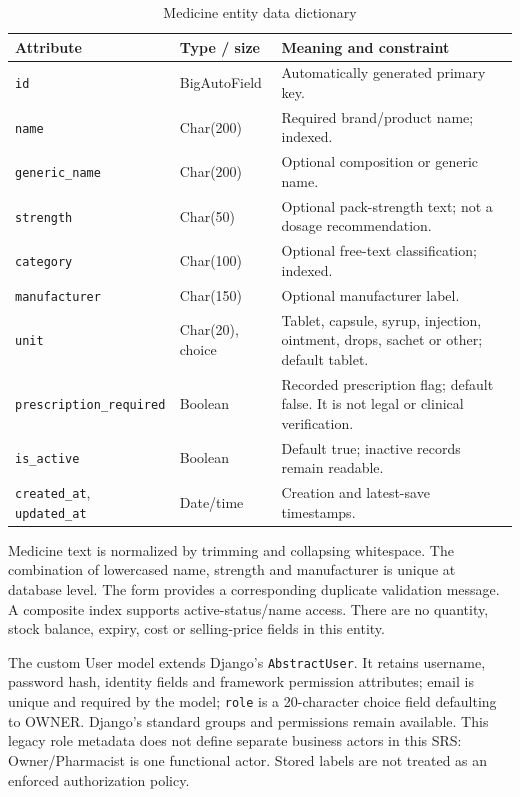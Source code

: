 \documentclass{article}
\begin{document}
\begin{table}[H]
\centering\small
\caption{Medicine entity data dictionary}
\begin{tabularx}{\textwidth}{L{46mm}L{28mm}Y}
\toprule Attribute & Type / size & Meaning and constraint\\\midrule
\texttt{id} & BigAutoField & Automatically generated primary key.\\
\texttt{name} & Char(200) & Required brand/product name; indexed.\\
\texttt{generic\_name} & Char(200) & Optional composition or generic name.\\
\texttt{strength} & Char(50) & Optional pack-strength text; not a dosage recommendation.\\
\texttt{category} & Char(100) & Optional free-text classification; indexed.\\
\texttt{manufacturer} & Char(150) & Optional manufacturer label.\\
\texttt{unit} & Char(20), choice & Tablet, capsule, syrup, injection, ointment, drops, sachet or other; default tablet.\\
\texttt{prescription\_required} & Boolean & Recorded prescription flag; default false. It is not legal or clinical verification.\\
\texttt{is\_active} & Boolean & Default true; inactive records remain readable.\\
\texttt{created\_at}, \texttt{updated\_at} & Date/time & Creation and latest-save timestamps.\\
\bottomrule
\end{tabularx}
\end{table}
Medicine text is normalized by trimming and collapsing whitespace. The combination of lowercased name, strength and manufacturer is unique at database level. The form provides a corresponding duplicate validation message. A composite index supports active-status/name access. There are no quantity, stock balance, expiry, cost or selling-price fields in this entity.

The custom User model extends Django's \texttt{AbstractUser}. It retains username, password hash, identity fields and framework permission attributes; email is unique and required by the model; \texttt{role} is a 20-character choice field defaulting to OWNER. Django's standard groups and permissions remain available. This legacy role metadata does not define separate business actors in this SRS: Owner/Pharmacist is one functional actor. Stored labels are not treated as an enforced authorization policy.
\end{document}
